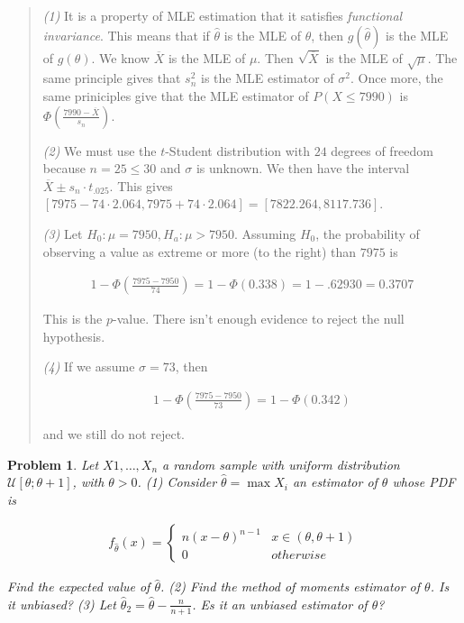 \documentclass[a4paper, 12pt]{article}
\newtheorem{problem}{Problem}
\newtheorem{problem}{Problem}
\begin{document}
\small
\begin{quote}

\textit{(1)} It is a property of MLE estimation that it satisfies
\textit{functional invariance}. This means that if $\hat{\theta}$ is the MLE of
$\theta$, then $g(\hat{\theta})$ is the MLE of $g(\theta)$. We know
$\overline{X}$ is the MLE of $\mu$. Then $\sqrt{\overline{X}} $ is the MLE of
$\sqrt{\mu} $. The same principle gives that $s_n^2$ is the MLE estimator of
$\sigma^2$. Once more, the same priniciples give that the MLE estimator of $P(X
\leq 7990)$ is $\Phi\left( \frac{7990 - \overline{X}}{s_n} \right)$.

\textit{(2)} We must use the $t$-Student distribution with $24$ degrees of
freedom because $n = 25 \leq 30$ and
$\sigma$ is unknown. We then have the interval $\overline{X} \pm s_n \cdot
t_{.025}$. This gives $\left[ 7975 - 74 \cdot 2.064, 7975 + 74 \cdot 2.064
\right] = \left[ 7822.264, 8117.736 \right]  $. 

\textit{(3)} Let $H_0 : \mu = 7950, H_a : \mu > 7950$. Assuming $H_0$, the
probability of observing a value as extreme or more (to the right) than $7975$
is 

\begin{align*}
    1 - \Phi( \frac{7975 - 7950}{74} ) = 1 - \Phi(0.338) = 1 - .62930 = 0.3707
\end{align*}

This is the $p$-value. There isn't enough evidence to reject the null
hypothesis.

\textit{(4)} If we assume $\sigma = 73$, then

    
\begin{align*}
    1 - \Phi( \frac{7975 - 7950}{73} ) = 1 - \Phi(0.342) 
\end{align*}

and we still do not reject.


\end{quote}
\normalsize

\pagebreak 

\begin{problem}
    Let $X1, \ldots, X_n$ a random sample with uniform distribution
    $\mathcal{U}\left[\theta; \theta + 1  \right] $, with $\theta > 0$.
    \textit{(1)} Consider $\hat{\theta} = \max X_i$ an estimator of $\theta$
    whose PDF is 

    \begin{align*}
        f_{\hat{\theta}}(x) = \begin{cases}
            n(x - \theta)^{n-1} & x \in (\theta, \theta + 1) \\ 
            0 & otherwise
        \end{cases}
    \end{align*}

    Find the expected value of $\hat{\theta}$.  \textit{(2)} Find the method of
    moments estimator of $\theta$. Is it unbiased? \textit{(3)} Let
    $\hat{\theta}_2 = \hat{\theta} - \frac{n}{n+1}$. Es it an unbiased estimator
    of $\theta$? 
\end{problem}
\end{document}
